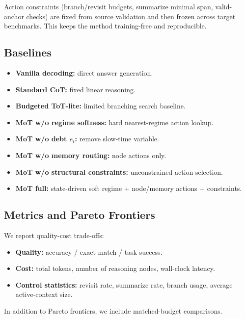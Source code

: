 \documentclass{article}
\begin{document}
Action constraints (branch/revisit budgets, summarize minimal span, valid-anchor checks) are fixed from source validation and then frozen across target benchmarks. This keeps the method training-free and reproducible.

\subsection{Baselines}
\begin{itemize}[leftmargin=1.3em, itemsep=0.2em]
    \item \textbf{Vanilla decoding:} direct answer generation.
    \item \textbf{Standard CoT:} fixed linear reasoning.
    \item \textbf{Budgeted ToT-lite:} limited branching search baseline.
    \item \textbf{MoT w/o regime softness:} hard nearest-regime action lookup.
    \item \textbf{MoT w/o debt $e_t$:} remove slow-time variable.
    \item \textbf{MoT w/o memory routing:} node actions only.
    \item \textbf{MoT w/o structural constraints:} unconstrained action selection.
    \item \textbf{MoT full:} state-driven soft regime + node/memory actions + constraints.
\end{itemize}

\subsection{Metrics and Pareto Frontiers}
We report quality-cost trade-offs:
\begin{itemize}[leftmargin=1.3em, itemsep=0.2em]
    \item \textbf{Quality:} accuracy / exact match / task success.
    \item \textbf{Cost:} total tokens, number of reasoning nodes, wall-clock latency.
    \item \textbf{Control statistics:} revisit rate, summarize rate, branch usage, average active-context size.
\end{itemize}
In addition to Pareto frontiers, we include matched-budget comparisons.
\end{document}
